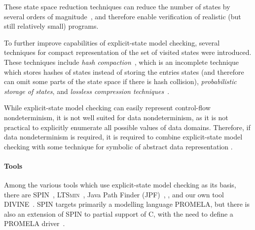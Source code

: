 These state space reduction techniques can reduce the number of states by
several orders of magnitude~\cite{TODO}, and therefore enable verification of
realistic (but still relatively small) programs.


To further improve capabilities of explicit-state model checking, several
techniques for compact representation of the set of visited states were
introduced.
These techniques include \emph{hash compaction}~\cite{TODO}, which is an
incomplete technique which stores hashes of states instead of storing the
entries states (and therefore can omit some parts of the state space if there
is hash collision), \emph{probabilistic storage of states}, and
\emph{lossless compression techniques}~\cite{RSB15TC,TODO}.

 While explicit-state model checking can easily represent
control-flow nondeterminism, it is not well suited for data nondeterminism, as
it is not practical to explicitly enumerate all possible values of data
domains.
Therefore, if data nondeterminism is required, it is required to combine explicit-state model checking with some technique for symbolic of abstract data representation .

\paragraph{Tools}

Among the various tools which use explicit-state model checking as its basis,
there are SPIN~\cite{Holzmann1997,Holzmann2004}, \textsc{LTSmin}~\cite{TODO}, Java Path Finder (JPF)~\cite{TODO}, , and our own tool DIVINE~\cite{DIVINEToolPaper2017}.
SPIN targets primarily a modelling language PROMELA, but there is also an extension of SPIN to partial support of C, with the need to define a PROMELA driver~\cite{Zaks2008}.

